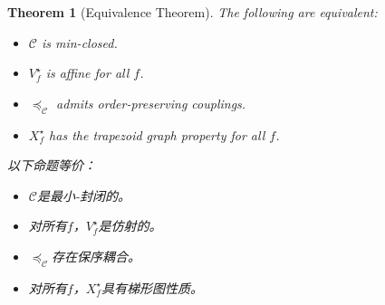 \documentclass[12pt,letterpaper]{article}
\newenvironment{original}{\color{black}}{}
\newenvironment{translation}{\color{blue}}{}
\theoremstyle{plain}
\newtheorem{theorem}{Theorem}
\theoremstyle{definition}
\theoremstyle{remark}
\newcommand{\C}{\mathcal{C}}
\theoremstyle{definition}
\begin{document}
\begin{theorem}[Equivalence Theorem]\label{thm:main}
\begin{original}
The following are equivalent:
\begin{itemize}
    \item[(a)] $\C$ is min-closed.
    \item[(b)] $V^\star_f$ is affine for all $f$.
    \item[(c)] $\preceq_{\C}$ admits order-preserving couplings.
    \item[(d)] $X^\star_f$ has the trapezoid graph property for all $f$.
\end{itemize}
\end{original}
\begin{translation}
以下命题等价：
\begin{itemize}
    \item[(a)] $\C$是最小-封闭的。
    \item[(b)] 对所有$f$，$V^\star_f$是仿射的。
    \item[(c)] $\preceq_{\C}$存在保序耦合。
    \item[(d)] 对所有$f$，$X^\star_f$具有梯形图性质。
\end{itemize}
\end{translation}
\end{theorem}
\end{document}
